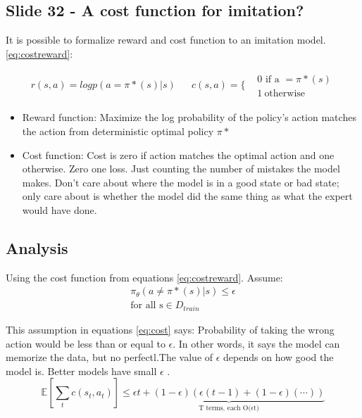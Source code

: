 \documentclass[]{article}
\begin{document}
\subsection*{Slide 32 - A cost function for imitation?}%
\label{sub:Slide 32 - A cost function for imitation?}

It is possible to formalize reward and cost function to an imitation model. 
\eqref{eq:costreward}:

\begin{align}
    \label{eq:costreward}
    r(s,a) = logp(a=\pi*(s)|s) && c(s,a) = \Bigg\{ 
        \begin{aligned} 
            & \text{0 if a }= \pi*(s) \\
            & 1 \ \text{otherwise}
        \end{aligned}
\end{align}

\begin{itemize}
    \item Reward function: Maximize the log probability of the policy's action matches the action from deterministic optimal policy $\pi*$
    \item Cost function:  Cost is zero if action matches the optimal action and one otherwise. Zero one loss. Just
        counting the number of mistakes the model makes. Don't care about where the model is in a good state
        or bad state; only care about is whether the model did the same thing as what the expert would have
        done.
\end{itemize}

\subsection*{Analysis}%
\label{sub:Analysis}

Using the cost function from equations \eqref{eq:costreward}. 
Assume:
\begin{equation}
    \label{eq:cost}
    \begin{split}
    \pi_{\theta}(a \neq \pi*(s)|s) \leq \epsilon \\ 
\text{for all s} \in D_{train}
    \end{split}
\end{equation}

\par This assumption in equations \eqref{eq:cost} says: Probability of taking the wrong action would be less than or
equal to $\epsilon$. In other words, it says the model can memorize the data, but no perfectl.The value of $\epsilon$
depends on how good the model is. Better models have small $\epsilon$ . 
\begin{equation}
    \label{eq:sumecost1}
    \mathbb{E} \left[ \sum_{t}c(s_{t},a_{t}) \right] \leq \underbrace{\epsilon t + (1 - \epsilon)(\epsilon (t - 1) + (1
    - \epsilon)(\cdots))}_{\text{T terms, each O($\epsilon $t)}}
\end{equation}
\end{document}

